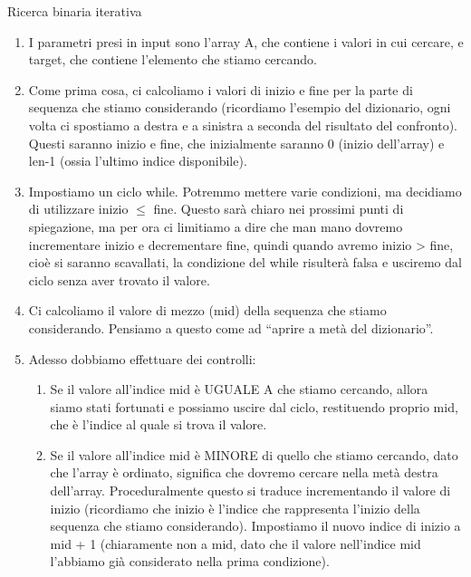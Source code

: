 \documentclass[12pt]{report}
\begin{document}
    \begin{algoritmo}{Ricerca binaria iterativa}{}
    	\begin{enumerate}
    				
    		\item I parametri presi in input sono l’array A, che contiene i valori in cui cercare, e target, che contiene l’elemento che stiamo cercando.
    				
    		\item Come prima cosa, ci calcoliamo i valori di inizio e fine per la parte di sequenza che stiamo considerando (ricordiamo l’esempio del dizionario, ogni volta ci spostiamo a destra e a sinistra a seconda del risultato del confronto). Questi saranno inizio e fine, che inizialmente saranno 0 (inizio dell’array) e len-1 (ossia l’ultimo indice disponibile).
    				
    		\item Impostiamo un ciclo while. Potremmo mettere varie condizioni, ma decidiamo di utilizzare inizio $\leq$ fine. Questo sarà chiaro nei prossimi punti di spiegazione, ma per ora ci limitiamo a dire che man mano dovremo incrementare inizio e decrementare fine, quindi quando avremo inizio > fine, cioè si saranno scavallati, la condizione del while risulterà falsa e usciremo dal ciclo senza aver trovato il valore.
    				
    		\item Ci calcoliamo il valore di mezzo (mid) della sequenza che stiamo considerando. Pensiamo a questo come ad “aprire a metà del dizionario”.
    				
    		\item Adesso dobbiamo effettuare dei controlli:
    		\begin{enumerate}
    					
    			\item Se il valore all’indice mid è UGUALE A che stiamo cercando, allora siamo stati fortunati e possiamo uscire dal ciclo, restituendo proprio mid, che è l’indice al quale si trova il valore.
    					
    			\item Se il valore all’indice mid è MINORE di quello che stiamo cercando, dato che l’array è ordinato, significa che dovremo cercare nella metà destra dell’array. Proceduralmente questo si traduce incrementando il valore di inizio (ricordiamo che inizio è l’indice che rappresenta l’inizio della sequenza che stiamo considerando). Impostiamo il nuovo indice di inizio a mid + 1 (chiaramente non a mid, dato che il valore nell’indice mid l’abbiamo già considerato nella prima condizione).
    					

\end{enumerate}
\end{enumerate}
\end{algoritmo}
\end{document}
